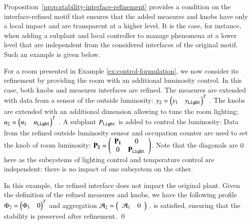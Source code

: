 \documentclass[runningheads]{llncs}
\newcommand{\Prop}[1]{Proposition~\ref{prop:#1}}
\newcommand{\measure}[1][]{y\ifx#1\relax\else^{#1}\fi}
\newcommand{\knob}[1][]{u\ifx#1\relax\else^{#1}\fi}
\newcommand{\profile}[1][]{\Phi\ifx#1\relax\else^{#1}\fi}
\newcommand{\aggregation}[1][]{\mathcal{A}\ifx#1\relax\else^{#1}\fi}
\newcommand{\subplant}[1][]{P\ifx#1\relax\else^{#1}\fi}
\newcommand{\predicatename}[1]{\mathtt{#1}}
\begin{document}
\Prop{stability-interface-refinement} provides a condition on the interface-refined motif that ensures that the added measures and knobs have only a local impact and are transparent at a higher level. It is the case, for instance, when adding a subplant and local controller to manage phenomena at a lower level that are independent from the considered interfaces of the original motif. Such an example is given below.

\begin{example}
For a room presented in Example \ref{ex:control-formulation}, 
we now consider its refinement by providing the room with an additional luminosity control. In this case, both knobs and measures interfaces are refined. The measures are extended with data from a sensor of the outside luminosity: 
    \(\measure_2 = \left(\begin{array}{@{}ll@{}}
         \measure_1 &
         \measure_{\predicatename{Light}}
    \end{array}\right)^T \) .
The knobs are extended with an additional dimension allowing to tune the room lighting:
    \(\knob_2 = \left(\begin{array}{@{}ll@{}}
         \knob_1 &
         \knob_{\predicatename{Light}}
    \end{array}\right)^T \) .
A subplant $\subplant_\predicatename{Light}$ is added to control the luminosity: Data from the refined outside luminosity sensor and occupation counter are used to set the knob of room luminosity:
    $\mathbf{\subplant_2} = \left(\begin{array}{cc}
        \mathbf{\subplant_1} & 0 \\
        0 & \mathbf{\subplant_{\predicatename{Light}}}
    \end{array}\right)$.
Note that the diagonals are $0$ here as the subsystems of lighting control and temperature control are independent: there is no impact of one subsystem on the other. 

In this example, the refined interface does not impact the original plant. Given the definition of the refined measures and knobs, we have the following profile $\profile_{2} = \left(\begin{array}{@{}ll@{}}
         \profile_1 &
         0
    \end{array}\right)^T $ 
    and aggregation $\aggregation_{2} = \left(\begin{array}{cc}
         \aggregation_1 &        0
    \end{array}\right)  $ .
     is satisfied, ensuring that the stability is preserved after refinement.
  \qed
\end{example}
\end{document}
